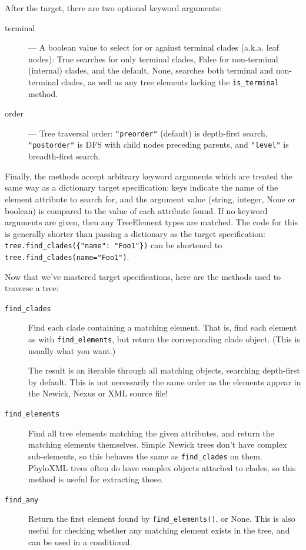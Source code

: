 \documentclass{report}
\begin{document}
After the target, there are two optional keyword arguments:

\begin{description}
  \item[terminal] --- A boolean value to select for or against terminal clades (a.k.a. leaf
    nodes): True searches for only terminal clades, False for non-terminal (internal) clades,
    and the default, None, searches both terminal and non-terminal clades, as well as any tree
    elements lacking the \verb|is_terminal| method.

  \item[order] --- Tree traversal order: \texttt{"preorder"} (default) is depth-first search,
    \texttt{"postorder"} is DFS with child nodes preceding parents, and \texttt{"level"} is
    breadth-first search.

\end{description}

Finally, the methods accept arbitrary keyword arguments which are treated the same way as a
dictionary target specification: keys indicate the name of the element attribute to search for,
and the argument value (string, integer, None or boolean) is compared to the value of each
attribute found. If no keyword arguments are given, then any TreeElement types are matched.
The code for this is generally shorter than passing a dictionary as the target specification:
\verb|tree.find_clades({"name": "Foo1"})| can be shortened to
\verb|tree.find_clades(name="Foo1")|.


Now that we've mastered target specifications, here are the methods used to traverse a tree:

\begin{description}
  \item[\texttt{find\_clades}]
    Find each clade containing a matching element. That is, find each element as with
    \verb|find_elements|, but return the corresponding clade object. (This is usually what you
    want.)

    The result is an iterable through all matching objects, searching depth-first by default.
    This is not necessarily the same order as the elements appear in the Newick, Nexus or XML
    source file!

  \item[\texttt{find\_elements}]
    Find all tree elements matching the given attributes, and return the matching elements
    themselves. Simple Newick trees don't have complex sub-elements, so this behaves the same
    as \verb|find_clades| on them. PhyloXML trees often do have complex objects attached to
    clades, so this method is useful for extracting those.

  \item[\texttt{find\_any}]
    Return the first element found by \verb|find_elements()|, or None. This is also useful for
    checking whether any matching element exists in the tree, and can be used in a conditional.

\end{description}
\end{document}

